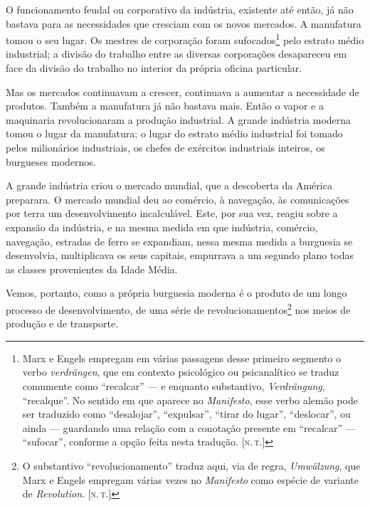 O funcionamento feudal ou corporativo da indústria, existente
até então, já não bastava para as necessidades que cresciam com os
novos mercados. A manufatura tomou o seu lugar. Os mestres de
corporação foram sufocados\footnote{ Marx e Engels empregam em várias passagens 
desse primeiro segmento o verbo \textit{verdrängen}, que em contexto psicológico 
ou psicanalítico se traduz comumente como ``recalcar''  ---  e enquanto
substantivo, \textit{Verdrängung}, ``recalque''. No sentido em que aparece 
no \textit{Manifesto}, esse verbo alemão pode ser traduzido como
``desalojar'', ``expulsar'', ``tirar do lugar'', ``deslocar'',  ou ainda  --- 
guardando uma relação com a conotação presente em ``recalcar''  --- 
``sufocar'', conforme a opção feita nesta tradução. [\textsc{n.\,t.}]}
pelo estrato médio industrial; a divisão do trabalho entre as
diversas corporações desapareceu em face da divisão do trabalho no
interior da própria oficina particular.

Mas os mercados continuavam a crescer, continuava a aumentar a
necessidade de produtos. Também a manufatura já não bastava mais. Então
o vapor e a maquinaria revolucionaram a produção industrial. A grande
indústria moderna tomou o lugar da manufatura; o lugar do estrato médio
industrial foi tomado pelos milionários industriais, os chefes de
exércitos industriais inteiros, os burgueses modernos.

A grande indústria criou o mercado mundial, que a descoberta da América
preparara. O mercado mundial deu ao comércio, à navegação, às
comunicações por terra um desenvolvimento incalculável. Este, por sua
vez, reagiu sobre a expansão da indústria, e na mesma medida em que
indústria, comércio, navegação, estradas de ferro se expandiam, nessa
mesma medida a burguesia se desenvolvia, multiplicava os seus capitais,
empurrava a um segundo plano todas as classes provenientes da Idade
Média.

Vemos, portanto, como a própria burguesia moderna é o produto de
um longo processo de desenvolvimento, de uma série de 
revolucionamentos\footnote{O substantivo ``revolucionamento'' traduz aqui, via de regra, \textit{Umwälzung}, que Marx e Engels empregam várias vezes no
\textit{Manifesto} como espécie de variante de \textit{Revolution}. [\textsc{n.\,t.}]} nos meios de produção e de transporte.

